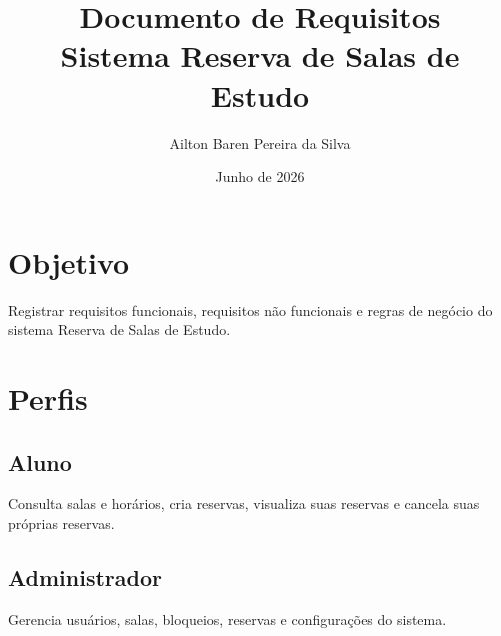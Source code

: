 \documentclass[12pt,a4paper]{article}
\title{\textbf{Documento de Requisitos}\\Sistema Reserva de Salas de Estudo}
\author{Ailton Baren Pereira da Silva}
\date{Junho de 2026}
\begin{document}
\maketitle

\section{Objetivo}
Registrar requisitos funcionais, requisitos não funcionais e regras de negócio do sistema Reserva de Salas de Estudo.

\section{Perfis}
\subsection{Aluno}
Consulta salas e horários, cria reservas, visualiza suas reservas e cancela suas próprias reservas.

\subsection{Administrador}
Gerencia usuários, salas, bloqueios, reservas e configurações do sistema.
\end{document}
